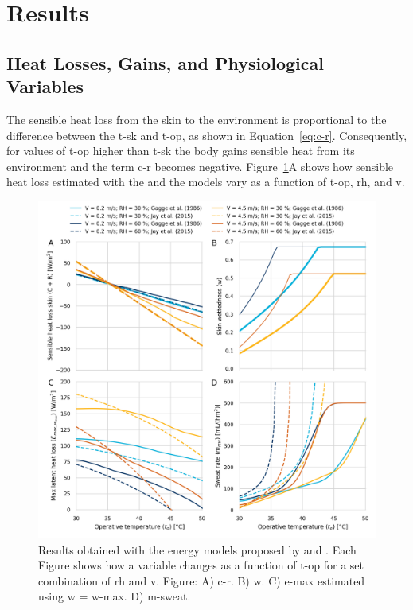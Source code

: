 
\section{Results}\label{sec:results}

\subsection{Heat Losses, Gains, and Physiological Variables}\label{subsec:res-heat-loss-physiological}

The sensible heat loss from the skin to the environment is proportional to the difference between the \ac{t-sk} and \ac{t-op}, as shown in Equation~\ref{eq:c-r}.
Consequently, for values of \ac{t-op} higher than \ac{t-sk} the body gains sensible heat from its environment and the term \ac{c-r} becomes negative.
Figure~\ref{fig:comparison_models}A shows how sensible heat loss estimated with the  and the  models vary as a function of \ac{t-op}, \ac{rh}, and \ac{v}.

\begin{figure}[hbt!]
    \centering
    \includegraphics[width=\textwidth]{figures/comparison_models_v2}
    \caption{Results obtained with the energy models proposed by  and .
    Each Figure shows how a variable changes as a function of \ac{t-op} for a set combination of \ac{rh} and \ac{v}.
    Figure: A) \Acf{c-r}.
    B) \Acf{w}.
    C) \Acf{e-max} estimated using \ac{w} = \ac{w-max}.
    D) \Acf{m-sweat}.}
    \label{fig:comparison_models}
\end{figure}

